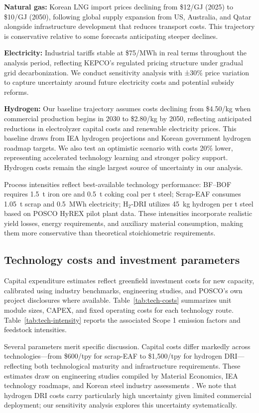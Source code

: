 \documentclass[preprint,1p,authoryear]{elsarticle}
\begin{document}
\textbf{Natural gas:} Korean LNG import prices declining from \$12/GJ (2025) to \$10/GJ (2050), following global supply expansion from US, Australia, and Qatar alongside infrastructure development that reduces transport costs. This trajectory is conservative relative to some forecasts anticipating steeper declines.

\textbf{Electricity:} Industrial tariffs stable at \$75/MWh in real terms throughout the analysis period, reflecting KEPCO's regulated pricing structure under gradual grid decarbonization. We conduct sensitivity analysis with ±30\% price variation to capture uncertainty around future electricity costs and potential subsidy reforms.

\textbf{Hydrogen:} Our baseline trajectory assumes costs declining from \$4.50/kg when commercial production begins in 2030 to \$2.80/kg by 2050, reflecting anticipated reductions in electrolyzer capital costs and renewable electricity prices. This baseline draws from IEA hydrogen projections and Korean government hydrogen roadmap targets. We also test an optimistic scenario with costs 20\% lower, representing accelerated technology learning and stronger policy support. Hydrogen costs remain the single largest source of uncertainty in our analysis.

Process intensities reflect best-available technology performance: BF--BOF requires 1.5~t iron ore and 0.5~t coking coal per t steel; Scrap-EAF consumes 1.05~t scrap and 0.5~MWh electricity; H$_2$-DRI utilizes 45~kg hydrogen per t steel based on POSCO HyREX pilot plant data. These intensities incorporate realistic yield losses, energy requirements, and auxiliary material consumption, making them more conservative than theoretical stoichiometric requirements.

\subsection{Technology costs and investment parameters}

Capital expenditure estimates reflect greenfield investment costs for new capacity, calibrated using industry benchmarks, engineering studies, and POSCO's own project disclosures where available. Table~\ref{tab:tech-costs} summarizes unit module sizes, CAPEX, and fixed operating costs for each technology route. Table~\ref{tab:tech-intensity} reports the associated Scope 1 emission factors and feedstock intensities.

Several parameters merit specific discussion. Capital costs differ markedly across technologies—from \$600/tpy for scrap-EAF to \$1,500/tpy for hydrogen DRI—reflecting both technological maturity and infrastructure requirements. These estimates draw on engineering studies compiled by Material Economics, IEA technology roadmaps, and Korean steel industry assessments \citep{MaterialEconomics2019,kuramochi2018beyond,prammer2021steel}. We note that hydrogen DRI costs carry particularly high uncertainty given limited commercial deployment; our sensitivity analysis explores this uncertainty systematically.
\end{document}
